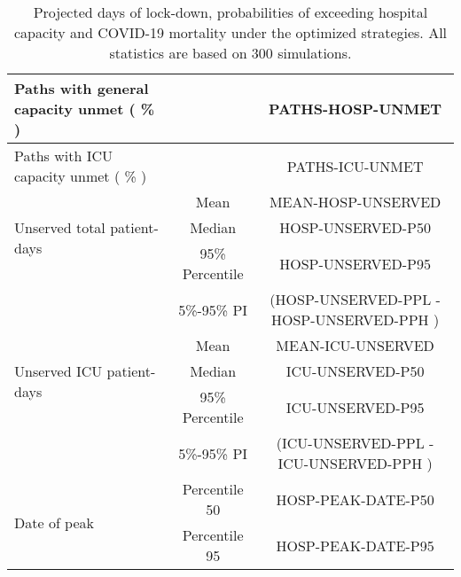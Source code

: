 \documentclass{article}
\begin{document}
\begin{table}[th]
\begin{tabular}{p{4cm}cc}
\multirow{1}{*}{Paths with general capacity unmet ( \% )} &      &         PATHS-HOSP-UNMET              \\   \midrule 
\multirow{1}{*}{Paths with ICU capacity unmet ( \% )} &      &         PATHS-ICU-UNMET              \\   \midrule 
\multirow{3}{\hsize}{Unserved total patient-days} & Mean & MEAN-HOSP-UNSERVED  \\ \cmidrule(l){2-3}
									& Median & HOSP-UNSERVED-P50  \\ \cmidrule(l){2-3} 
									& 95\% Percentile     & HOSP-UNSERVED-P95    \\ \cmidrule(l){2-3} 
									& 5\%-95\% PI & (HOSP-UNSERVED-PPL - HOSP-UNSERVED-PPH )       \\ \midrule
\multirow{3}{\hsize}{Unserved ICU patient-days} & Mean & MEAN-ICU-UNSERVED  \\ \cmidrule(l){2-3}
									& Median & ICU-UNSERVED-P50  \\ \cmidrule(l){2-3} 
									& 95\% Percentile     & ICU-UNSERVED-P95    \\ \cmidrule(l){2-3} 
									& 5\%-95\% PI & (ICU-UNSERVED-PPL - ICU-UNSERVED-PPH )       \\ \midrule
									
\multirow{2}{\hsize}{Date of peak}  & Percentile 50     & HOSP-PEAK-DATE-P50    \\ \cmidrule(l){2-3} 
                                     & Percentile 95     & HOSP-PEAK-DATE-P95     \\  \bottomrule

\end{tabular}
\caption{Projected days of lock-down, probabilities of exceeding hospital capacity and COVID-19 mortality under the optimized strategies. All statistics are based on 300 simulations.}

\label{table:summary_table}
\end{table}
\end{document}
